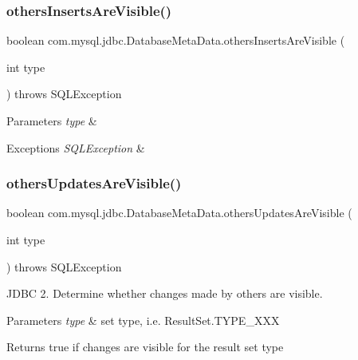 \subsubsection{\texorpdfstring{others\+Inserts\+Are\+Visible()}{othersInsertsAreVisible()}}
{\footnotesize\ttfamily boolean com.\+mysql.\+jdbc.\+Database\+Meta\+Data.\+others\+Inserts\+Are\+Visible (\begin{DoxyParamCaption}\item[{int}]{type }\end{DoxyParamCaption}) throws S\+Q\+L\+Exception}


\begin{DoxyParams}{Parameters}
{\em type} & \\
\hline
\end{DoxyParams}

\begin{DoxyExceptions}{Exceptions}
{\em S\+Q\+L\+Exception} & \\
\hline
\end{DoxyExceptions}
\mbox{\label{classcom_1_1mysql_1_1jdbc_1_1_database_meta_data_adcae7a4fa6824a850662ac5d2d6db5e2}} 
\subsubsection{\texorpdfstring{others\+Updates\+Are\+Visible()}{othersUpdatesAreVisible()}}
{\footnotesize\ttfamily boolean com.\+mysql.\+jdbc.\+Database\+Meta\+Data.\+others\+Updates\+Are\+Visible (\begin{DoxyParamCaption}\item[{int}]{type }\end{DoxyParamCaption}) throws S\+Q\+L\+Exception}

J\+D\+BC 2. Determine whether changes made by others are visible.


\begin{DoxyParams}{Parameters}
{\em type} & set type, i.\+e. Result\+Set.\+T\+Y\+P\+E\+\_\+\+X\+XX \\
\hline
\end{DoxyParams}
\begin{DoxyReturn}{Returns}
true if changes are visible for the result set type 
\end{DoxyReturn}

